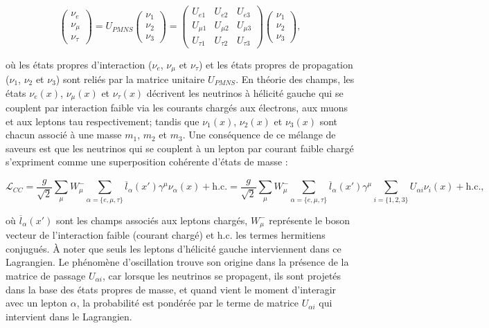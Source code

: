 \begin{equation}
\left( \begin{matrix}
    \nu_e \\
    \nu_\mu \\
    \nu_\tau
\end{matrix} \right) = U_{PMNS} \left( \begin{matrix}
    \nu_1 \\
    \nu_2 \\
    \nu_3
\end{matrix} \right) = \left( \begin{matrix}
    U_{e1} & U_{e2} & U_{e3} \\
    U_{\mu 1} & U_{\mu 2} & U_{\mu 3} \\
    U_{\tau 1} & U_{\tau 2} & U_{\tau 3}
\end{matrix} \right) \left( \begin{matrix}
    \nu_1 \\
    \nu_2 \\
    \nu_3
\end{matrix} \right),
\end{equation}

\bigbreak

où les états propres d'interaction ($\nu_e$, $\nu_\mu$ et $\nu_\tau$) et les états propres de propagation ($\nu_1$, $\nu_2$ et $\nu_3$) sont reliés par la matrice unitaire $U_{PMNS}$. En théorie des champs, les états $\nu_e(x)$, $\nu_\mu(x)$ et $\nu_\tau(x)$ décrivent les neutrinos à hélicité gauche qui se couplent par interaction faible via les courants chargés aux électrons, aux muons et aux leptons tau respectivement; tandis que $\nu_1(x)$, $\nu_2(x)$ et $\nu_3(x)$ sont chacun associé à une masse $m_1$, $m_2$ et $m_3$. Une conséquence de ce mélange de saveurs est que les neutrinos qui se couplent à un lepton par courant faible chargé s'expriment comme une superposition cohérente d'états de masse :

\begin{equation}
    \mathcal{L}_{CC} = \frac{g}{\sqrt{2}} \sum_\mu W_\mu^- \sum_{\alpha = \{ e,\mu,\tau \}} \overline{l}_\alpha(x') \gamma^\mu \nu_\alpha(x) + \textrm{h.c.} =  \frac{g}{\sqrt{2}} \sum_\mu W_\mu^- \sum_{\alpha = \{ e,\mu,\tau \}} \overline{l}_\alpha(x') \gamma^\mu \sum_{i = \{ 1,2,3 \} } U_{\alpha i} \nu_i(x) + \textrm{h.c.},
\end{equation}

\bigbreak

où $\overline{l}_\alpha(x')$ sont les champs associés aux leptons chargés, $W^-_\mu$ représente le boson vecteur de l'interaction faible (courant chargé) et h.c. les termes hermitiens conjugués. À noter que seuls les leptons d'hélicité gauche interviennent dans ce Lagrangien. Le phénomène d'oscillation trouve son origine dans la présence de la matrice de passage $U_{\alpha i}$, car lorsque les neutrinos se propagent, ils sont projetés dans la base des états propres de masse, et quand vient le moment d'interagir avec un lepton $\alpha$, la probabilité est pondérée par le terme de matrice $U_{\alpha i}$ qui intervient dans le Lagrangien.\\

